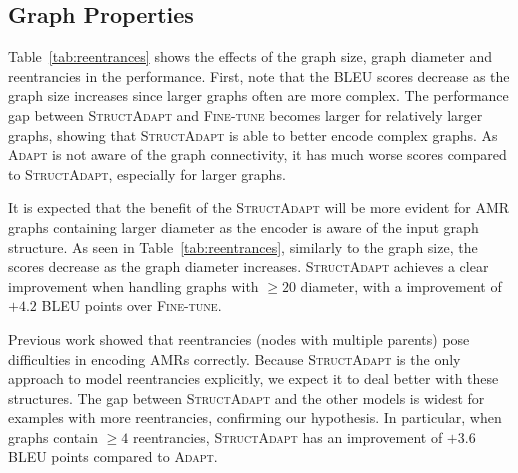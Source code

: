 \documentclass[11pt]{article}
\newcommand{\graphadapter}{{\small\textsc{StructAdapt}}\xspace}
\newcommand{\vanilladapter}{{\small\textsc{Adapt}}\xspace}
\newcommand{\finetune}{{\small\textsc{Fine-tune}}\xspace}
\begin{document}
\subsection{Graph Properties}

Table~\ref{tab:reentrances} shows the effects of the graph size, graph diameter and reentrancies in the performance. First, note that the BLEU scores decrease as the graph size increases since larger graphs often are more complex. The performance gap between \graphadapter and \finetune becomes larger for relatively larger graphs, showing that \graphadapter is able to better encode complex graphs. As \vanilladapter is not aware of the graph connectivity, it has much worse scores compared to \graphadapter, especially for larger graphs. 

It is expected that the beneﬁt of the \graphadapter will be more evident for AMR graphs containing larger diameter as the encoder is aware of the input graph structure. As seen in Table~\ref{tab:reentrances}, similarly to the graph size, the scores decrease as the graph diameter increases. \graphadapter achieves a clear improvement when handling graphs with ${\geq}20$ diameter, with a improvement of $+4.2$ BLEU points over \finetune. 

Previous work \cite{damonte-cohen-2019-structural,szubert-etal-2020-role} showed that reentrancies (nodes with multiple parents) pose difficulties in encoding AMRs correctly. Because \graphadapter is the only approach to model reentrancies explicitly, we expect it to deal better with these structures. The gap between \graphadapter and the other models is widest for examples with more reentrancies, confirming our hypothesis. In particular, when graphs contain ${\geq}4$ reentrancies, \graphadapter has an improvement of $+3.6$ BLEU points compared to \vanilladapter.
\end{document}
